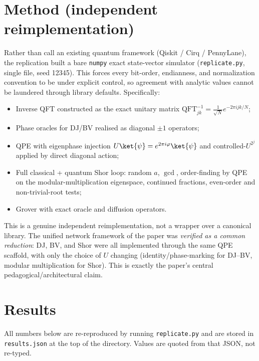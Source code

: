 \documentclass[11pt]{article}
\begin{document}
\section{Method (independent reimplementation)}
Rather than call an existing quantum framework (Qiskit / Cirq / PennyLane),
the replication built a bare \texttt{numpy} exact state-vector simulator
(\texttt{replicate.py}, single file, seed 12345). This forces every bit-order,
endianness, and normalization convention to be under explicit control, so
agreement with analytic values cannot be laundered through library defaults.
Specifically:
\begin{itemize}
    \item Inverse QFT constructed as the exact unitary matrix
          $\text{QFT}^{-1}_{jk} = \frac{1}{\sqrt{N}}e^{-2\pi i jk/N}$;
    \item Phase oracles for DJ/BV realised as diagonal $\pm 1$ operators;
    \item QPE with eigenphase injection $U\ket{\psi}=e^{2\pi i\varphi}\ket{\psi}$
          and controlled-$U^{2^{j}}$ applied by direct diagonal action;
    \item Full classical + quantum Shor loop: random $a$, $\gcd$, order-finding
          by QPE on the modular-multiplication eigenspace, continued
          fractions, even-order and non-trivial-root tests;
    \item Grover with exact oracle and diffusion operators.
\end{itemize}
This is a genuine independent reimplementation, not a wrapper over a
canonical library. The unified network framework of the paper was
\emph{verified as a common reduction}: DJ, BV, and Shor were all
implemented through the same QPE scaffold, with only the choice of $U$
changing (identity/phase-marking for DJ--BV, modular multiplication for
Shor). This is exactly the paper's central pedagogical/architectural claim.

\section{Results}
All numbers below are re-reproduced by running \texttt{replicate.py} and are
stored in \texttt{results.json} at the top of the directory. Values are quoted
from that JSON, not re-typed.
\end{document}
